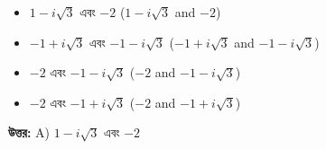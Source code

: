 \documentclass[12pt, a4paper]{article}
\begin{document}
\begin{itemize}[label={}, leftmargin=1cm, itemsep=0.5em]
    \item[\textbf{A)}] $1 - i\sqrt{3}$ এবং $-2$ ($1 - i\sqrt{3}$ and $-2$)
    \item[\textbf{B)}] $-1 + i\sqrt{3}$ এবং $-1 - i\sqrt{3}$ ($-1 + i\sqrt{3}$ and $-1 - i\sqrt{3}$)
    \item[\textbf{C)}] $-2$ এবং $-1 - i\sqrt{3}$ ($-2$ and $-1 - i\sqrt{3}$)
    \item[\textbf{D)}] $-2$ এবং $-1 + i\sqrt{3}$ ($-2$ and $-1 + i\sqrt{3}$)
\end{itemize}

\vspace{0.5em}
\begin{tcolorbox}[answerbox]
    \textbf{\color{success} উত্তর:} A) $1 - i\sqrt{3}$ এবং $-2$
\end{tcolorbox}
\vspace{1em}
\end{document}
